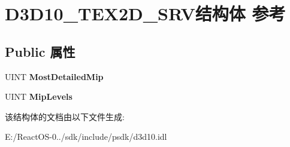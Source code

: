 \hypertarget{struct_d3_d10___t_e_x2_d___s_r_v}{}\section{D3\+D10\+\_\+\+T\+E\+X2\+D\+\_\+\+S\+R\+V结构体 参考}
\label{struct_d3_d10___t_e_x2_d___s_r_v}
\subsection*{Public 属性}
\begin{DoxyCompactItemize}
\item 
\mbox{\label{struct_d3_d10___t_e_x2_d___s_r_v_a3a087baf660f41e51d98b41e5f648e6e}} 
U\+I\+NT {\bfseries Most\+Detailed\+Mip}
\item 
\mbox{\label{struct_d3_d10___t_e_x2_d___s_r_v_ad077062a063f7e0344aa866b3796f35b}} 
U\+I\+NT {\bfseries Mip\+Levels}
\end{DoxyCompactItemize}


该结构体的文档由以下文件生成\+:\begin{DoxyCompactItemize}
\item 
E\+:/\+React\+O\+S-\/0../sdk/include/psdk/d3d10.\+idl\end{DoxyCompactItemize}
